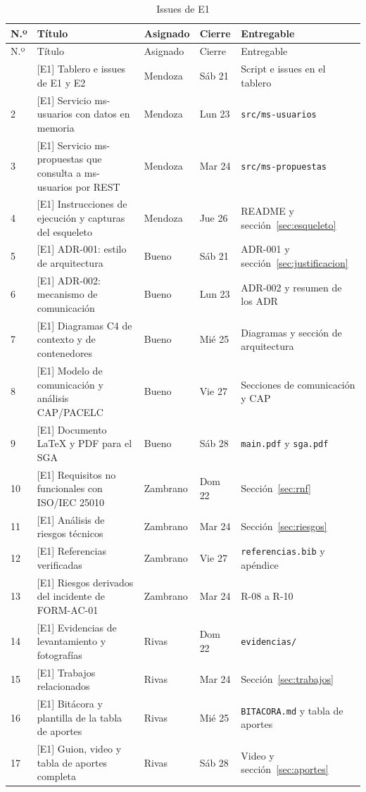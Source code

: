 \begingroup
\footnotesize
\setlength{\tabcolsep}{3pt}
\begin{longtable}{@{}L{0.8cm}L{6.8cm}L{1.6cm}L{1.3cm}L{4.4cm}@{}}
\caption{Issues de E1}\label{tab:issues-e1}\\
\toprule
N.º & Título & Asignado & Cierre & Entregable \\
\midrule
\endfirsthead
\toprule
N.º & Título & Asignado & Cierre & Entregable \\
\midrule
\endhead
\bottomrule
{} & [E1] Tablero e issues de E1 y E2 & Mendoza & Sáb 21 & Script e issues en el tablero \\
2 & [E1] Servicio ms-usuarios con datos en memoria & Mendoza & Lun 23 & \texttt{src/ms-usuarios} \\
3 & [E1] Servicio ms-propuestas que consulta a ms-usuarios por REST & Mendoza & Mar 24 & \texttt{src/ms-propuestas} \\
4 & [E1] Instrucciones de ejecución y capturas del esqueleto & Mendoza & Jue 26 & README y sección~\ref{sec:esqueleto} \\
5 & [E1] ADR-001: estilo de arquitectura & Bueno & Sáb 21 & ADR-001 y sección~\ref{sec:justificacion} \\
6 & [E1] ADR-002: mecanismo de comunicación & Bueno & Lun 23 & ADR-002 y resumen de los ADR \\
7 & [E1] Diagramas C4 de contexto y de contenedores & Bueno & Mié 25 & Diagramas y sección de arquitectura \\
8 & [E1] Modelo de comunicación y análisis CAP/PACELC & Bueno & Vie 27 & Secciones de comunicación y CAP \\
9 & [E1] Documento LaTeX y PDF para el SGA & Bueno & Sáb 28 & \texttt{main.pdf} y \texttt{sga.pdf} \\
10 & [E1] Requisitos no funcionales con ISO/IEC 25010 & Zambrano & Dom 22 & Sección~\ref{sec:rnf} \\
11 & [E1] Análisis de riesgos técnicos & Zambrano & Mar 24 & Sección~\ref{sec:riesgos} \\
12 & [E1] Referencias verificadas & Zambrano & Vie 27 & \texttt{referencias.bib} y apéndice \\
13 & [E1] Riesgos derivados del incidente de FORM-AC-01 & Zambrano & Mar 24 & R-08 a R-10 \\
14 & [E1] Evidencias de levantamiento y fotografías & Rivas & Dom 22 & \texttt{evidencias/} \\
15 & [E1] Trabajos relacionados & Rivas & Mar 24 & Sección~\ref{sec:trabajos} \\
16 & [E1] Bitácora y plantilla de la tabla de aportes & Rivas & Mié 25 & \texttt{BITACORA.md} y tabla de aportes \\
17 & [E1] Guion, video y tabla de aportes completa & Rivas & Sáb 28 & Video y sección~\ref{sec:aportes} \\
\end{longtable}
\endgroup

